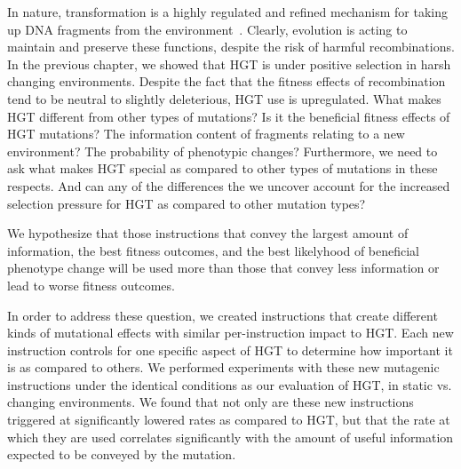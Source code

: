\documentclass[PhD]{msu-thesis}
\begin{document}
In nature, transformation is a highly regulated and refined mechanism for taking up DNA fragments from the environment~\cite{solomon_whos_1996,seitz_cues_2013,fontaine_novel_2010}. 
Clearly, evolution is acting to maintain and preserve these functions, despite the risk of harmful recombinations. In the previous chapter, we showed that HGT is under positive selection in harsh changing environments. Despite the fact that the fitness effects of recombination tend to be neutral to slightly deleterious, HGT use is upregulated. What makes HGT different from other types of mutations? Is it the beneficial fitness effects of HGT mutations?
The information content of fragments relating to a new environment? The probability of phenotypic changes? Furthermore, we need to ask what makes HGT special as compared to other types of mutations in these respects. And can any of the differences the we uncover account for the increased selection pressure for HGT as compared to other mutation types? 

We hypothesize that those instructions that convey the largest amount of information, the best fitness outcomes, and the best likelyhood of beneficial phenotype change will be used more than those that convey less information or lead to worse fitness outcomes. 

In order to address these question, we created instructions that create different kinds of mutational effects with similar per-instruction impact to HGT.  
Each new instruction controls for one specific aspect of HGT to determine how important it is as compared to others.
We performed experiments with these new mutagenic instructions under the identical conditions as our evaluation of HGT, in static vs. changing environments. We found that not only are these new instructions triggered at significantly lowered rates as compared to HGT, but that the rate at which they are used correlates significantly with the amount of useful information expected to be conveyed by the mutation. 
\end{document}
